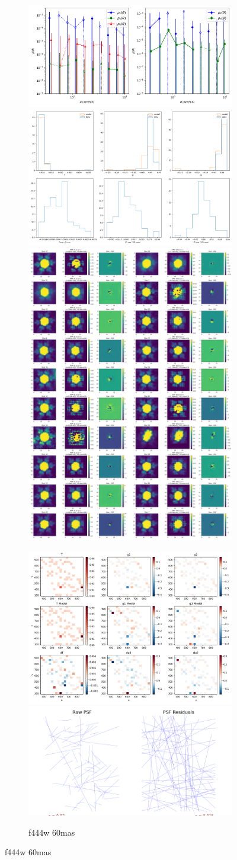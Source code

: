 \documentclass[a4 paper]{article}
\numberwithin{equation}{section}
\newcommand{\0}{\mathbf{0}}
\begin{document}
\begin{figure}[!h]
  \begin{subfigure}{\linewidth}
  \includegraphics[width=.3\linewidth]{444.60.54/piff_rho.png}\hfill
  \includegraphics[width=.3\linewidth]{444.60.54/piff_shapes.png}\hfill
  \includegraphics[width=.3\linewidth]{444.60.54/piff_stars.png}
  \end{subfigure}\par\medskip
  \begin{subfigure}{\linewidth}
  \includegraphics[width=.3\linewidth]{444.60.54/piff_twod.png}\hfill
  \includegraphics[width=.3\linewidth]{444.60.54/piff_whisker.png}\hfill
  \caption{f444w 60mas}
  \end{subfigure}\par\medskip


\end{figure}\\
\end{document}
